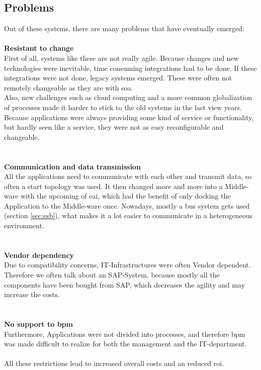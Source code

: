 \documentclass[12pt]{article}
\begin{document}
\subsection{Problems}
Out of these systems, there are many problems that have eventually emerged:
\\ \\\textbf{Resistant to change}\\
First of all, systems like these are not really agile. Because changes and new technologies were inevitable, time consuming integrations had to be done. If these integrations were not done, legacy systems emerged. These were often not remotely changeable as they are with \gls{soa}. \\
Also, new challenges such as cloud computing and a more common globalization of processes made it harder to stick to the old systems in the last view years. \\
Because applications were always providing some kind of service or functionality, but hardly seen like a service, they were not as easy reconfigurable and changeable. \\
\\ \\\textbf{Communication and data transmission}\\
All the applications need to communicate with each other and transmit data, so often a start topology was used. It then changed more and more into a Middle-ware with the upcoming of \gls{eai}, which had the benefit of only docking the Application to the Middle-ware once. Nowadays, mostly a bus system gets used (section \ref{sec:esb}), what makes it a lot easier to communicate in a heterogeneous environment. \\
\\ \\\textbf{Vendor dependency}\\
Due to compatibility concerns, IT-Infrastructures were often Vendor dependent. Therefore we often talk about an SAP-System, because mostly all the components have been bought from SAP, which decreases the agility and may increase the costs.\\
\\ \\\textbf{No support to \gls{bpm}}\\
Furthermore, Applications were not divided into processes, and therefore \gls{bpm} was made difficult to realize for both the management and the IT-department. \\ \\
All these restrictions lead to increased overall costs and an reduced \gls{roi}.
\end{document}
